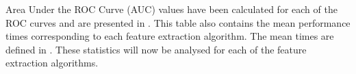\documentclass[11pt]{report}
\begin{document}


Area Under the ROC Curve (AUC) values have been calculated for each of the ROC curves and are presented in . This table also contains the mean performance times corresponding to each feature extraction algorithm. The mean times are defined in . These statistics will now be analysed for each of the feature extraction algorithms.\\

\end{document}
